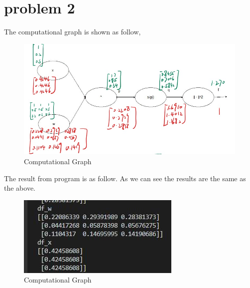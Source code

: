 \documentclass[conference]{IEEEtran}
\begin{document}
\section*{problem 2}
The computational graph is shown as follow,
\begin{figure}[H]
    \centerline{\includegraphics[scale=0.27]{pic3.jpg}}
    \caption{Computational Graph}
\end{figure}

The result from program is as follow. As we can see the results are the same as the above.
\begin{figure}[H]
    \centerline{\includegraphics[scale=0.8]{pic4.jpg}}
    \caption{Computational Graph}
\end{figure}
\end{document}
